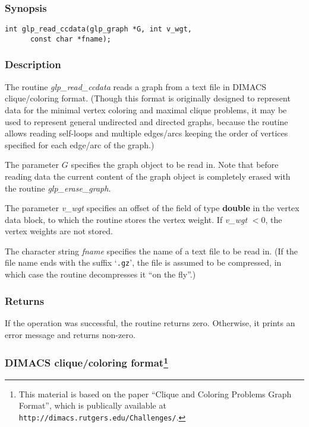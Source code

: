 \documentclass[dvipdfm,11pt]{report}
\begin{document}
\subsubsection*{Synopsis}

\begin{verbatim}
int glp_read_ccdata(glp_graph *G, int v_wgt,
      const char *fname);
\end{verbatim}

\subsubsection*{Description}

The routine {\it glp\_read\_ccdata} reads a graph from a text file in
DIMACS clique/coloring format. (Though this format is originally
designed to represent data for the minimal vertex coloring and maximal
clique problems, it may be used to represent general undirected and
directed graphs, because the routine allows reading self-loops and
multiple edges/arcs keeping the order of vertices specified for each
edge/arc of the graph.)

The parameter $G$ specifies the graph object to be read in. Note that
before reading data the current content of the graph object is
completely erased with the routine {\it glp\_erase\_graph}.

The parameter {\it v\_wgt} specifies an offset of the field of type
{\bf double} in the vertex data block, to which the routine stores the
vertex weight. If {\it v\_wgt} $<0$, the vertex weights are not stored.

The character string {\it fname} specifies the name of a text file to
be read in. (If the file name ends with the suffix `\verb|.gz|', the
file is assumed to be compressed, in which case the routine decompresses
it ``on the fly''.)

\subsubsection*{Returns}

If the operation was successful, the routine returns zero. Otherwise,
it prints an error message and returns non-zero.

\subsubsection*{DIMACS clique/coloring format\footnote{This material is
based on the paper ``Clique and Coloring Problems Graph Format'', which
is publically available at
{\tt http://dimacs.rutgers.edu/Challenges/}.}}
\end{document}
